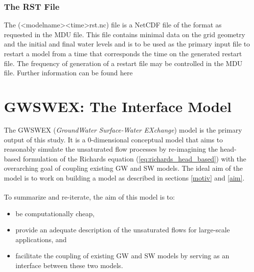\subsubsection*{The RST File}
The (\textless model\textunderscore name\textgreater \textunderscore \textless time\textgreater \textunderscore rst.nc) file is a NetCDF file of the format as requested in the MDU file. This file contains minimal data on the grid geometry and the initial and final water levels and is to be used as the primary input file to restart a model from a time that corresponds the time on the generated restart file. The frequency of generation of a restart file may be controlled in the MDU file. Further information can be found here \cite[p.~472]{Deltares2016}


\section{GWSWEX: The Interface Model}
\label{GWSWEX}
The GWSWEX (\textit{GroundWater Surface-Water EXchange}) model is the primary output of this study. It is a 0-dimensional conceptual model that aims to reasonably simulate the unsaturated flow processes by re-imagining the head-based formulation of the Richards equation (\ref{eq:richards_head_based}) with the overarching goal of coupling existing GW and SW models. The ideal aim of the model is to work on building a model as described in sections \ref{motiv} and \ref{aim}. 
\\ \\
To summarize and re-iterate, the aim of this model is to:
\begin{itemize}
    \item be computationally cheap,
    \item provide an adequate description of the unsaturated flows for large-scale applications, and
    \item facilitate the coupling of existing GW and SW models by serving as an interface between these two models.
\end{itemize}

